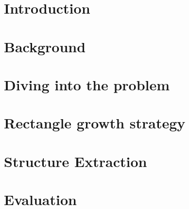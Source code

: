 \documentclass{report}
\begin{document}
\chapter{Introduction}


\chapter{Background}


\chapter{Diving into the problem}


\chapter{Rectangle growth strategy}


\chapter{Structure Extraction}


\chapter{Evaluation}

\end{document}
